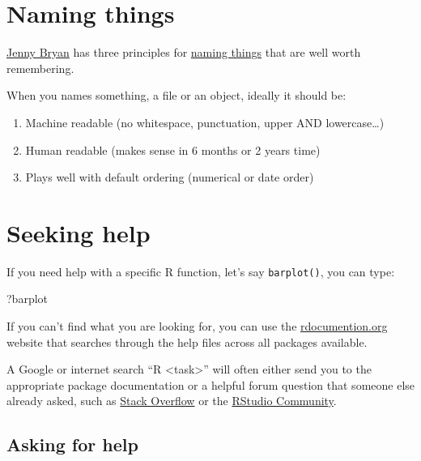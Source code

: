 \documentclass[12pt,]{book}
\newenvironment{Shaded}{\begin{snugshade}}{\end{snugshade}}
\newcommand{\NormalTok}[1]{#1}
\providecommand{\tightlist}{%
  \setlength{\itemsep}{0pt}\setlength{\parskip}{0pt}}
\begin{document}
\hypertarget{names}{%
\section{Naming things}\label{names}}

\href{https://ropensci.org/blog/2017/12/08/rprofile-jenny-bryan/}{Jenny Bryan}
has three principles for \href{http://www2.stat.duke.edu/~rcs46/lectures_2015/01-markdown-git/slides/naming-slides/naming-slides.pdf}{naming things} that are well worth remembering.

When you names something, a file or an object, ideally it should be:

\begin{enumerate}
\def\labelenumi{\arabic{enumi}.}
\tightlist
\item
  Machine readable (no whitespace, punctuation, upper AND lowercase\ldots{})
\item
  Human readable (makes sense in 6 months or 2 years time)
\item
  Plays well with default ordering (numerical or date order)
\end{enumerate}

\hypertarget{seeking-help}{%
\section{Seeking help}\label{seeking-help}}

If you need help with a specific R function, let's say \texttt{barplot()}, you can type:

\begin{Shaded}
\begin{Highlighting}[]
\NormalTok{?barplot}
\end{Highlighting}
\end{Shaded}

If you can't find what you are looking for, you can use the
\href{http://www.rdocumentation.org}{rdocumention.org} website that searches through
the help files across all packages available.

A Google or internet search ``R \textless{}task\textgreater{}'' will often either send you to the appropriate package documentation or a helpful forum question that someone else already asked,
such as \href{http://stackoverflow.com/questions/tagged/r}{Stack Overflow} or
the \href{https://community.rstudio.com/}{RStudio Community}.

\hypertarget{asking-for-help}{%
\subsection{Asking for help}\label{asking-for-help}}
\end{document}
